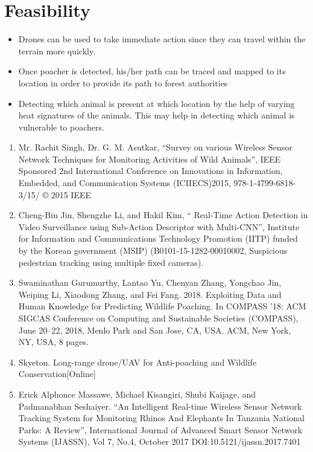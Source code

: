 \documentclass[12pt]{extarticle}
\begin{document}
\section{Feasibility}
\begin{itemize}
	\item Drones can be used to take immediate action since they can travel within the terrain more quickly.
	\item Once poacher is detected, his/her path can be traced and mapped to its location in order to provide its path to forest authorities
	\item Detecting which animal is present at which location by the help of varying heat signatures of the animals. This may help in detecting which animal is vulnerable to poachers.	
\end{itemize}




\begin{enumerate}
	\item Mr. Rachit Singh, Dr. G. M. Asutkar, “Survey on various Wireless Sensor Network Techniques for Monitoring Activities of Wild Animals”, IEEE Sponsored 2nd International Conference on Innovations in Information, Embedded, and Communication Systems (ICIIECS)2015, 978-1-4799-6818-3/15/ © 2015 IEEE
	\item Cheng-Bin Jin, Shengzhe Li, and Hakil Kim, “ Real-Time Action Detection in Video Surveillance using Sub-Action Descriptor with Multi-CNN”, Institute for Information and Communications Technology Promotion (IITP) funded by the Korean government (MSIP) (B0101-15-1282-00010002, Suspicious pedestrian tracking using multiple fixed cameras).
	\item Swaminathan Gurumurthy, Lantao Yu, Chenyan Zhang, Yongchao Jin, Weiping Li, Xiaodong Zhang, and Fei Fang. 2018. Exploiting Data and Human Knowledge for Predicting Wildlife Poaching. In COMPASS ’18: ACM SIGCAS Conference on Computing and Sustainable Societies (COMPASS), June 20–22, 2018, Menlo Park and San Jose, CA, USA. ACM, New York, NY, USA, 8 pages.
	\item Skyeton. Long-range drone/UAV for Anti-poaching and Wildlife Conservation[Online]
	\item Erick Alphonce Massawe, Michael Kisangiri, Shubi Kaijage, and Padmanabhan Seshaiyer. “An Intelligent Real-time Wireless Sensor Network Tracking System for Monitoring Rhinos And Elephants In Tanzania National Parks: A Review”, International Journal of Advanced Smart Sensor Network Systems (IJASSN), Vol 7, No.4, October 2017 DOI:10.5121/ijassn.2017.7401
\end{enumerate}
\end{document}
